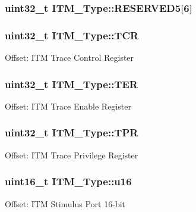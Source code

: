 \subsubsection[{\texorpdfstring{R\+E\+S\+E\+R\+V\+E\+D5}{RESERVED5}}]{\setlength{\rightskip}{0pt plus 5cm}uint32\+\_\+t I\+T\+M\+\_\+\+Type\+::\+R\+E\+S\+E\+R\+V\+E\+D5\mbox{[}6\mbox{]}}\hypertarget{structITM__Type_a7f70161bc2441d430b5c9d55aa7b7b5e}{}\label{structITM__Type_a7f70161bc2441d430b5c9d55aa7b7b5e}
\subsubsection[{\texorpdfstring{T\+CR}{TCR}}]{ uint32\+\_\+t I\+T\+M\+\_\+\+Type\+::\+T\+CR}\hypertarget{structITM__Type_a58f169e1aa40a9b8afb6296677c3bb45}{}\label{structITM__Type_a58f169e1aa40a9b8afb6296677c3bb45}
Offset\+: I\+TM Trace Control Register 
\subsubsection[{\texorpdfstring{T\+ER}{TER}}]{ uint32\+\_\+t I\+T\+M\+\_\+\+Type\+::\+T\+ER}\hypertarget{structITM__Type_a91a040e1b162e1128ac1e852b4a0e589}{}\label{structITM__Type_a91a040e1b162e1128ac1e852b4a0e589}
Offset\+: I\+TM Trace Enable Register 
\subsubsection[{\texorpdfstring{T\+PR}{TPR}}]{ uint32\+\_\+t I\+T\+M\+\_\+\+Type\+::\+T\+PR}\hypertarget{structITM__Type_a93b480aac6da620bbb611212186d47fa}{}\label{structITM__Type_a93b480aac6da620bbb611212186d47fa}
Offset\+: I\+TM Trace Privilege Register 
\subsubsection[{\texorpdfstring{u16}{u16}}]{ uint16\+\_\+t I\+T\+M\+\_\+\+Type\+::u16}\hypertarget{structITM__Type_a12aa4eb4d9dcb589a5d953c836f4e8f4}{}\label{structITM__Type_a12aa4eb4d9dcb589a5d953c836f4e8f4}
Offset\+: I\+TM Stimulus Port 16-\/bit 
